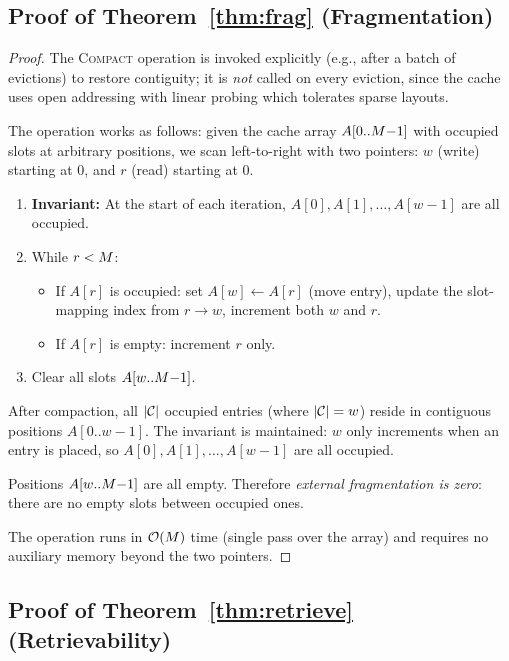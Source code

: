 \subsection{Proof of Theorem~\ref{thm:frag} (Fragmentation)}
\label{sec:proof-frag}

\begin{proof}
The \textsc{Compact} operation is invoked explicitly (e.g., after a
batch of evictions) to restore contiguity; it is \emph{not} called on
every eviction, since the cache uses open addressing with linear probing
which tolerates sparse layouts.

The operation works as follows: given the cache array
$A[0..M{-}1]$ with occupied slots at arbitrary positions, we
scan left-to-right with two pointers: $w$ (write) starting at 0,
and $r$ (read) starting at 0.

\begin{enumerate}
  \item \textbf{Invariant:} At the start of each iteration,
    $A[0], A[1], \dots, A[w{-}1]$ are all occupied.
  \item While $r < M$:
    \begin{itemize}
      \item If $A[r]$ is occupied: set $A[w] \gets A[r]$ (move entry),
            update the slot-mapping index from $r \to w$,
            increment both $w$ and $r$.
      \item If $A[r]$ is empty: increment $r$ only.
    \end{itemize}
  \item Clear all slots $A[w..M{-}1]$.
\end{enumerate}

After compaction, all $|\mathcal{C}|$ occupied entries (where $|\mathcal{C}| = w$)
reside in contiguous positions $A[0..w{-}1]$.  The invariant is
maintained: $w$ only increments when an entry is placed, so
$A[0], A[1], \dots, A[w{-}1]$ are all occupied.

Positions $A[w..M{-}1]$ are all empty.  Therefore
\emph{external fragmentation is zero}: there are no empty slots
between occupied ones.

The operation runs in $\mathcal{O}(M)$ time (single pass over the array)
and requires no auxiliary memory beyond the two pointers.
\end{proof}


\subsection{Proof of Theorem~\ref{thm:retrieve} (Retrievability)}
\label{sec:proof-retrieve}

